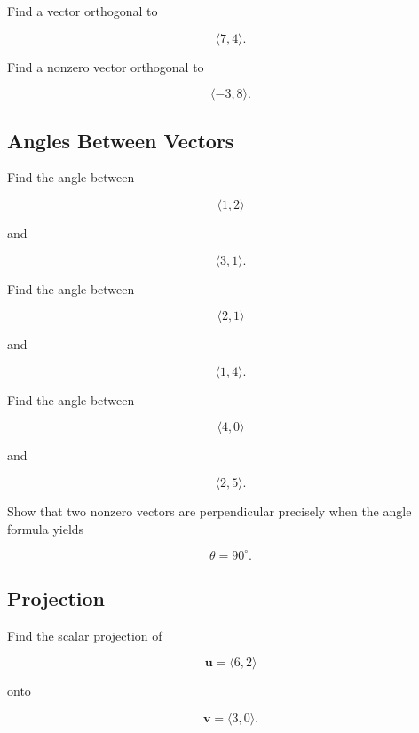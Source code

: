 \begin{exercise}
Find a vector orthogonal to

\[
\langle 7,4\rangle.
\]
\end{exercise}

\begin{exercise}
Find a nonzero vector orthogonal to

\[
\langle -3,8\rangle.
\]
\end{exercise}

\subsection*{Angles Between Vectors}

\begin{exercise}
Find the angle between

\[
\langle 1,2\rangle
\]

and

\[
\langle 3,1\rangle.
\]
\end{exercise}

\begin{exercise}
Find the angle between

\[
\langle 2,1\rangle
\]

and

\[
\langle 1,4\rangle.
\]
\end{exercise}

\begin{exercise}
Find the angle between

\[
\langle 4,0\rangle
\]

and

\[
\langle 2,5\rangle.
\]
\end{exercise}

\begin{exercise}
Show that two nonzero vectors are perpendicular precisely when the angle
formula yields

\[
\theta=90^\circ.
\]
\end{exercise}

\subsection*{Projection}

\begin{exercise}
Find the scalar projection of

\[
\mathbf{u}
=
\langle 6,2\rangle
\]

onto

\[
\mathbf{v}
=
\langle 3,0\rangle.
\]
\end{exercise}

